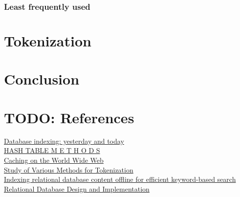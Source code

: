 \documentclass[10pt,a4paper]{article}
\begin{document}
\subsubsection{Least frequently used}

\section{Tokenization}


\section{Conclusion}


\section*{TODO: References}
\href{https://citeseerx.ist.psu.edu/pdf/24ad3ea19602f0737807cb05fafe44c6c2f86aaf}{Database indexing: yesterday and today}\\
\href{https://dl.acm.org/doi/pdf/10.1145/356643.356645}{HASH TABLE M E T H O D S}\\
\href{https://ieeexplore.ieee.org/abstract/document/755618?casa_token=1dPMFNh1uOMAAAAA:EhTd5TzTa1RHsWQThUec5nDGgAe82xXTYaG32s8GsTNty9qoUoSPlu0Rzh-it8kQ-qtl19_LX-0KjA}{Caching on the World Wide Web}\\
\href{https://link.springer.com/chapter/10.1007/978-981-15-6198-6_18}{Study of Various Methods for Tokenization}\\
\href{https://ieeexplore.ieee.org/abstract/document/1540920?casa_token=hzg5FRuCiVQAAAAA:MDNu1j1gc-DR7xTkOo22jTVIlq55BcYoatyx97bKzY3HdvAw_7-4sRhCNF-iXQcbZQTw2Bb3u0YQxg}{Indexing relational database content offline for efficient keyword-based search}
\href{https://books.google.sk/books?hl=en&lr=&id=yQgfCgAAQBAJ&oi=fnd&pg=PP1&dq=relational+database&ots=qPKwl0TFYt&sig=6jOwNojMeS_JzJYt9NTVB7_gJwk&redir_esc=y#v=onepage&q=relational%20database&f=false}{Relational Database Design and Implementation}




\end{document}
